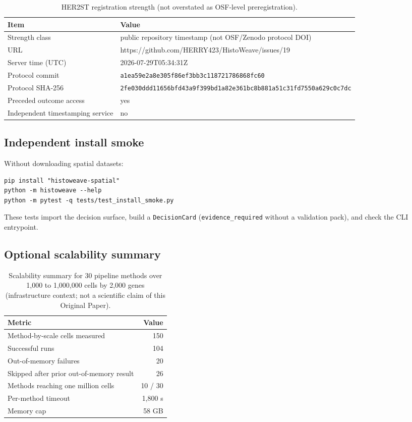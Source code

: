 \documentclass[11pt]{article}
\begin{document}
\begin{table}[ht]
\centering
\caption{HER2ST registration strength (not overstated as OSF-level preregistration).
\label{tab:si-reg}}
\begin{tabular}{@{}lp{}@{}}
\toprule
Item & Value \\
\midrule
Strength class & public repository timestamp (not OSF/Zenodo protocol DOI) \\
URL & https://github.com/HERRY423/HistoWeave/issues/19 \\
Server time (UTC) & 2026-07-29T05:34:31Z \\
Protocol commit & \texttt{a1ea59e2a8e305f86ef3bb3c118721786868fc60} \\
Protocol SHA-256 &
\texttt{2fe030ddd11656bfd43a9f399bd1a82e361bc8b881a51c31fd7550a629c0c7dc} \\
Preceded outcome access & yes \\
Independent timestamping service & no \\
\bottomrule
\end{tabular}
\end{table}

\subsection{Independent install smoke}

Without downloading spatial datasets:

\begin{verbatim}
pip install "histoweave-spatial"
python -m histoweave --help
python -m pytest -q tests/test_install_smoke.py
\end{verbatim}

These tests import the decision surface, build a \texttt{DecisionCard}
(\texttt{evidence\_required} without a validation pack), and check the CLI
entrypoint.

\subsection{Optional scalability summary}

\begin{table}[ht]
\centering
\caption{Scalability summary for 30 pipeline methods over 1,000 to
1,000,000 cells by 2,000 genes (infrastructure context; not a scientific
claim of this Original Paper).
\label{tab:scale}}
\begin{tabular}{@{}lr@{}}
\toprule
Metric & Value \\
\midrule
Method-by-scale cells measured & 150 \\
Successful runs & 104 \\
Out-of-memory failures & 20 \\
Skipped after prior out-of-memory result & 26 \\
Methods reaching one million cells & 10 / 30 \\
Per-method timeout & 1,800 s \\
Memory cap & 58 GB \\
\bottomrule
\end{tabular}
\end{table}
\end{document}
